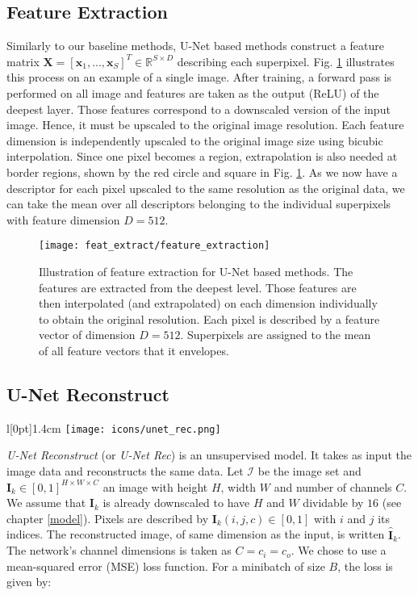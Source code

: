 \subsection{Feature Extraction} \label{feat_extract}
Similarly to our baseline methods, U-Net based methods construct a feature matrix $\boldsymbol{X} = [\boldsymbol{x}_1,...,\boldsymbol{x}_S]^T \in \mathbb{R}^{S \times D}$ describing each superpixel. Fig. \ref{fig:feat_extract} illustrates this process on an example of a single image. After training, a forward pass is performed on all image and features are taken as the output (ReLU) of the deepest layer. Those features correspond to a downscaled version of the input image. Hence, it must be upscaled to the original image resolution. Each feature dimension is independently upscaled to the original image size using bicubic interpolation. Since one pixel becomes a region, extrapolation is also needed at border regions, shown by the red circle and square in Fig. \ref{fig:feat_extract}. As we now have a descriptor for each pixel upscaled to the same resolution as the original data, we can take the mean over all descriptors belonging to the individual superpixels with feature dimension $D=512$.
\vspace{10pt}

\begin{figure}[htbp]
  \centering
  \texttt{[image: feat\_extract/feature\_extraction]}
  \caption[Feature extraction model]{Illustration of feature extraction for U-Net based methods. The features are extracted from the deepest level. Those features are then interpolated (and extrapolated) on each dimension individually to obtain the original resolution. Each pixel is described by a feature vector of dimension $D=512$.
    Superpixels are assigned to the mean of all feature vectors that it envelopes.}
  \label{fig:feat_extract}
\end{figure}

\subsection{U-Net Reconstruct}
\begingroup
\setlength\intextsep{0pt}
\begin{wrapfigure}[4]{l}[0pt]{1.4cm}
\texttt{[image: icons/unet\_rec.png]}
\end{wrapfigure}

\textit{U-Net Reconstruct} (or \textit{U-Net Rec}) is an unsupervised model. It takes as input the image data and reconstructs the same data. Let $\mathcal{I}$ be the image set and $\boldsymbol{I}_k \in [0,1]^{H \times W \times C}$ an image with height $H$, width $W$ and number of channels $C$. We assume that $\boldsymbol{I}_k$ is already downscaled to have $H$ and $W$ dividable by $16$ (see chapter \ref{model}). Pixels are described by $\boldsymbol{I}_k(i,j,c) \in [0,1]$ with $i$ and $j$ its indices. The reconstructed image, of same dimension as the input, is written $\boldsymbol{\hat{I}}_k$. The network's channel dimensions is taken as $C = c_i = c_o$. We chose to use a mean-squared error (MSE) loss function. For a minibatch of size $B$, the loss is given by:

